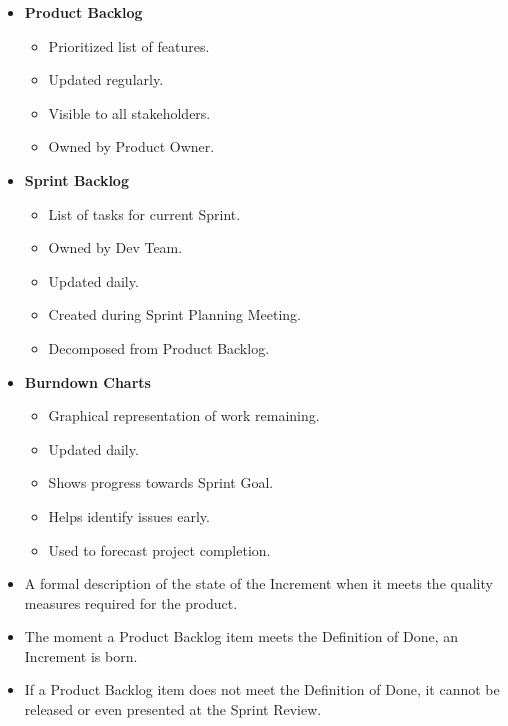 \documentclass[10pt]{article}
\begin{document}
\begin{multicols}{5}
\begin{block}
    \begin{itemize}
        \item \textbf{Product Backlog}
        \begin{itemize}
            \item Prioritized list of features.
            \item Updated regularly.
            \item Visible to all stakeholders.
            \item Owned by Product Owner.
        \end{itemize}
        \item \textbf{Sprint Backlog}
        \begin{itemize}
            \item List of tasks for current Sprint.
            \item Owned by Dev Team.
            \item Updated daily.
            \item Created during Sprint Planning Meeting.
            \item Decomposed from Product Backlog.
        \end{itemize}
        \item \textbf{Burndown Charts}
        \begin{itemize}
            \item Graphical representation of work remaining.
            \item Updated daily.
            \item Shows progress towards Sprint Goal.
            \item Helps identify issues early.
            \item Used to forecast project completion.
        \end{itemize}
    \end{itemize}
\end{block}

\begin{block}
    \begin{itemize}
        \item A formal description of the state of the Increment when it meets the quality measures required for the product.
        \item The moment a Product Backlog item meets the Definition of Done, an Increment is born.
        \item If a Product Backlog item does not meet the Definition of Done, it cannot be released or even presented at the Sprint Review.
    \end{itemize}
\end{block}


\end{multicols}
\end{document}
